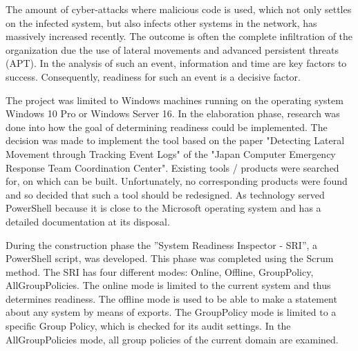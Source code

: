 
\thispagestyle{plain}
\renewcommand\section{\stdsection}
The amount of cyber-attacks where malicious code is used, which not only settles on the infected system, but also infects other systems in the network, has massively increased recently. The outcome is often the complete infiltration of the organization due the use of lateral movements and advanced persistent threats (APT). In the analysis of such an event, information and time are key factors to success. Consequently, readiness for such an event is a decisive factor.

The project was limited to Windows machines running on the operating system Windows 10 Pro or Windows Server 16. In the elaboration phase, research was done into how the goal of determining readiness could be implemented. The decision was made to implement the tool based on the paper "Detecting Lateral Movement through Tracking Event Logs" of the "Japan Computer Emergency Response Team Coordination Center". Existing tools / products were searched for, on which can be built. Unfortunately, no corresponding products were found and so decided that such a tool should be redesigned. As technology served PowerShell because it is close to the Microsoft operating system and has a detailed documentation at its disposal.

During the construction phase the ''System Readiness Inspector - SRI'', a PowerShell script, was developed. This phase was completed using the Scrum method. The SRI has four different modes: Online, Offline, GroupPolicy, AllGroupPolicies. The online mode is limited to the current system and thus determines readiness. The offline mode is used to be able to make a statement about any system by means of exports. The GroupPolicy mode is limited to a specific Group Policy, which is checked for its audit settings. In the AllGroupPolicies mode, all group policies of the current domain are examined. 
\thispagestyle{plain}